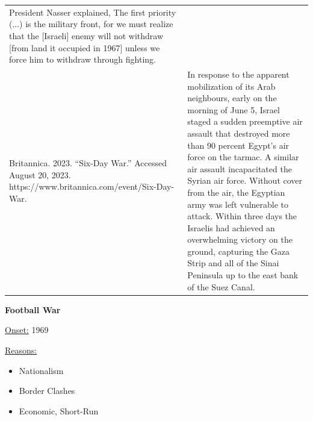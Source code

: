 {\begin{longtable}{p{}p{}}
President Nasser explained, The first priority (...) is the military front, for we must realize that the [Israeli] enemy will not withdraw [from land it occupied in 1967] unless we force him to withdraw through fighting.
\\
Britannica. 2023. “Six-Day War.” Accessed August 20, 2023. https://www.britannica.com/event/Six-Day-War. & In response to the apparent mobilization of its Arab neighbours, early on the morning of June 5, Israel staged a sudden preemptive air assault that destroyed more than 90 percent Egypt's air force on the tarmac. A similar air assault incapacitated the Syrian air force. Without cover from the air, the Egyptian army was left vulnerable to attack. Within three days the Israelis had achieved an overwhelming victory on the ground, capturing the Gaza Strip and all of the Sinai Peninsula up to the east bank of the Suez Canal.


\\
\end{longtable}}
\clearpage
         \textbf{Football War} 

          \underline{Onset:} 1969         

\underline{Reasons:}
\begin{itemize}
\item Nationalism
\item Border Clashes
\item Economic, Short-Run
\end{itemize}

